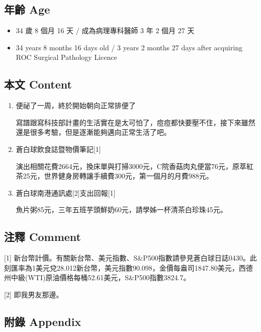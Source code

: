 \documentclass[a5paper, 11pt
]{book}
\providecommand{\tightlist}{%
  \setlength{\itemsep}{0pt}\setlength{\parskip}{0pt}}
\begin{document}
\hypertarget{ux5e74ux9f61-age-38}{%
\subsection{年齡 Age}\label{ux5e74ux9f61-age-38}}

\begin{itemize}
\tightlist
\item
  34 歲 8 個月 16 天 / 成為病理專科醫師 3 年 2 個月 27 天
\item
  34 years 8 months 16 days old / 3 years 2 months 27 days after
  acquiring ROC Surgical Pathology Licence
\end{itemize}

\hypertarget{ux672cux6587-content-38}{%
\subsection{本文 Content}\label{ux672cux6587-content-38}}

\begin{enumerate}
\def\labelenumi{\arabic{enumi}.}
\item
  便祕了一周，終於開始朝向正常排便了

  寫譜跟寫科技部計畫的生活實在是太可怕了，痘痘都快要壓不住，接下來雖然還是很多考驗，但是逐漸能夠邁向正常生活了吧。
\item
  蒼白球飲食誌暨物價筆記{[}1{]}

  演出相關花費2664元，換床單與打掃3000元，C院香菇肉丸便當76元，原萃紅茶25元，世界健身房轉讓手續費300元，第一個月的月費988元。
\item
  蒼白球南港通訊處{[}2{]}支出回報{[}1{]}

  魚片粥85元，三年五班芋頭鮮奶60元，請學姊一杯清茶白珍珠45元。
\end{enumerate}

\hypertarget{ux6ce8ux91cb-comment-38}{%
\subsection{注釋 Comment}\label{ux6ce8ux91cb-comment-38}}

{[}1{]}
新台幣計價。有關新台幣、美元指數、S\&P500指數請參見蒼白球日誌0430。此刻匯率為1美元兌28.012新台幣，美元指數90.098，金價每盎司1847.80美元，西德州中級(WTI)原油價格每桶52.61美元，S\&P500指數3824.7。

{[}2{]} 即我男友那邊。

\hypertarget{ux9644ux9304-appendix-38}{%
\subsection{附錄 Appendix}\label{ux9644ux9304-appendix-38}}
\end{document}
